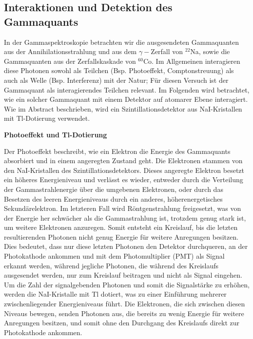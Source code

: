\documentclass[%
aps,
onecolumn,
11pt,
tightenlines,
nofootinbib,
superscriptaddress,
floatfix,
prd,
]{revtex4-2}
\begin{document}
\subsection{Interaktionen und Detektion des Gammaquants}
\label{sec:Interaktionen}
In der Gammaspektroskopie betrachten wir die ausgesendeten Gammaquanten aus der Annihilationsstrahlung und aus dem $\gamma-$Zerfall von $^{22}$Na, sowie die Gammaquanten aus der Zerfallskaskade von $^{60}$Co. Im Allgemeinen interagieren diese Photonen sowohl als Teilchen (Bsp. Photoeffekt, Comptonstreuung) als auch als Welle (Bsp. Interferenz) mit der Natur; Für diesen Versuch ist der Gammaquant als interagierendes Teilchen relevant. Im Folgenden wird betrachtet, wie ein solcher Gammaquant mit einem Detektor auf atomarer Ebene interagiert. Wie im Abstract beschrieben, wird ein Szintillationsdetektor aus NaI-Kristallen mit Tl-Dotierung verwendet.\vspace{15pt}\par
\textbf{Photoeffekt und Tl-Dotierung} \par
Der Photoeffekt beschreibt, wie ein Elektron die Energie des Gammaquants absorbiert und in einem angeregten Zustand geht. Die Elektronen stammen von den NaI-Kristallen des Szintillationsdetektors. Dieses angeregte Elektron besetzt ein höheres Energieniveau und verlässt es wieder, entweder durch die Verteilung der Gammastrahlenergie über die umgebenen Elektronen, oder durch das Besetzen des leeren Energieniveaus durch ein anderes, höherenergetisches Sekundärelektron. Im letzteren Fall wird Röntgenstrahlung freigesetzt, was von der Energie her schwächer als die Gammastrahlung ist, trotzdem genug stark ist, um weitere Elektronen anzuregen. Somit entsteht ein Kreislauf, bis die letzten resultierenden Photonen nicht genug Energie für weitere Anregungen besitzen. Dies bedeutet, dass nur diese letzten Photonen den Detektor durchqueren, an der Photokathode ankommen und mit dem Photomultiplier (PMT) als Signal erkannt werden, während jegliche Photonen, die während des Kreislaufs ausgesendet werden, nur zum Kreislauf beitragen und nicht als Signal eingehen. Um die Zahl der signalgebenden Photonen und somit die Signalstärke zu erhöhen, werden die NaI-Kristalle mit Tl dotiert, was zu einer Einführung mehrerer zwischenliegender Energieniveaus führt. Die Elektronen, die sich zwischen diesen Niveaus bewegen, senden Photonen aus, die bereits zu wenig Energie für weitere Anregungen besitzen, und somit ohne den Durchgang des Kreislaufs direkt zur Photokathode ankommen. \vspace{15pt}\par
\end{document}
